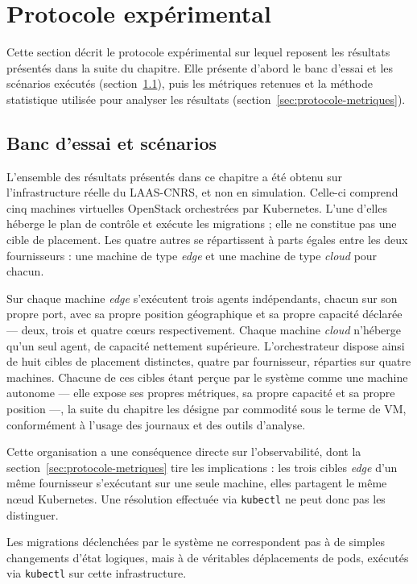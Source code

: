 \newpage
\section{Protocole expérimental}
\label{sec:protocole}

Cette section décrit le protocole expérimental sur lequel reposent les résultats présentés dans la suite du chapitre. Elle présente d'abord le banc d'essai et les scénarios exécutés (section~\ref{sec:protocole-scenarios}), puis les métriques retenues et la méthode statistique utilisée pour analyser les résultats (section~\ref{sec:protocole-metriques}).

\subsection{Banc d'essai et scénarios}
\label{sec:protocole-scenarios}

L'ensemble des résultats présentés dans ce chapitre a été obtenu sur l'infrastructure réelle du LAAS-CNRS, et non en simulation. Celle-ci comprend cinq machines virtuelles OpenStack orchestrées par Kubernetes. L'une d'elles héberge le plan de contrôle et exécute les migrations ; elle ne constitue pas une cible de placement. Les quatre autres se répartissent à parts égales entre les deux fournisseurs : une machine de type \emph{edge} et une machine de type \emph{cloud} pour chacun.

Sur chaque machine \emph{edge} s'exécutent trois agents indépendants, chacun sur son propre port, avec sa propre position géographique et sa propre capacité déclarée — deux, trois et quatre cœurs respectivement. Chaque machine \emph{cloud} n'héberge qu'un seul agent, de capacité nettement supérieure. L'orchestrateur dispose ainsi de huit cibles de placement distinctes, quatre par fournisseur, réparties sur quatre machines. Chacune de ces cibles étant perçue par le système comme une machine autonome — elle expose ses propres métriques, sa propre capacité et sa propre position —, la suite du chapitre les désigne par commodité sous le terme de VM, conformément à l'usage des journaux et des outils d'analyse.

Cette organisation a une conséquence directe sur l'observabilité, dont la section~\ref{sec:protocole-metriques} tire les implications : les trois cibles \emph{edge} d'un même fournisseur s'exécutant sur une seule machine, elles partagent le même nœud Kubernetes. Une résolution effectuée via \texttt{kubectl} ne peut donc pas les distinguer.

Les migrations déclenchées par le système ne correspondent pas à de simples changements d'état logiques, mais à de véritables déplacements de pods, exécutés via \texttt{kubectl} sur cette infrastructure.


